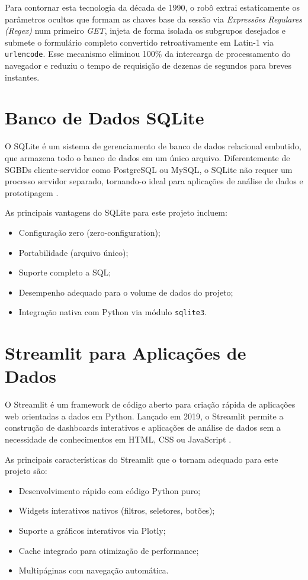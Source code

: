 \documentclass[
    12pt,
    oneside,
    a4paper,
    chapter=TITLE,
    section=TITLE
]{abntex2}
\begin{document}
Para contornar esta tecnologia da década de 1990, o robô extrai estaticamente os parâmetros ocultos que formam as chaves base da sessão via \textit{Expressões Regulares (Regex)} num primeiro \textit{GET}, injeta de forma isolada os subgrupos desejados e submete o formulário completo convertido retroativamente em Latin-1 via \texttt{urlencode}. Esse mecanismo eliminou 100\% da intercarga de processamento do navegador e reduziu o tempo de requisição de dezenas de segundos para breves instantes.

\section{Banco de Dados SQLite}

O SQLite é um sistema de gerenciamento de banco de dados relacional embutido, que armazena todo o banco de dados em um único arquivo. Diferentemente de SGBDs cliente-servidor como PostgreSQL ou MySQL, o SQLite não requer um processo servidor separado, tornando-o ideal para aplicações de análise de dados e prototipagem \cite{sqlite2026}.

As principais vantagens do SQLite para este projeto incluem:

\begin{itemize}
    \item Configuração zero (zero-configuration);
    \item Portabilidade (arquivo único);
    \item Suporte completo a SQL;
    \item Desempenho adequado para o volume de dados do projeto;
    \item Integração nativa com Python via módulo \texttt{sqlite3}.
\end{itemize}

\section{Streamlit para Aplicações de Dados}

O Streamlit é um framework de código aberto para criação rápida de aplicações web orientadas a dados em Python. Lançado em 2019, o Streamlit permite a construção de dashboards interativos e aplicações de análise de dados sem a necessidade de conhecimentos em HTML, CSS ou JavaScript \cite{streamlit2026}.

As principais características do Streamlit que o tornam adequado para este projeto são:

\begin{itemize}
    \item Desenvolvimento rápido com código Python puro;
    \item Widgets interativos nativos (filtros, seletores, botões);
    \item Suporte a gráficos interativos via Plotly;
    \item Cache integrado para otimização de performance;
    \item Multipáginas com navegação automática.
\end{itemize}
\end{document}
